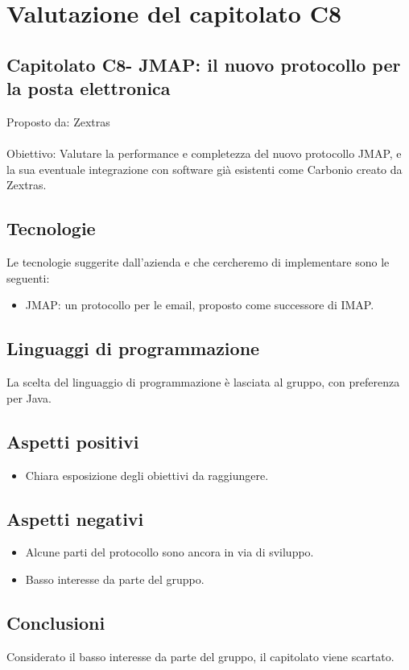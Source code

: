 \documentclass{article}
\begin{document}
\section{Valutazione del capitolato C8}
\subsection{Capitolato C8- JMAP: il nuovo protocollo per la posta elettronica}
Proposto da: Zextras\\ \\
Obiettivo: Valutare la performance e completezza del nuovo protocollo JMAP, e la sua eventuale integrazione con software già esistenti come Carbonio creato da Zextras.
\subsection{Tecnologie}
Le tecnologie suggerite dall’azienda e che cercheremo di implementare sono le seguenti:
\begin{itemize}
    \item JMAP: un protocollo per le email, proposto come successore di IMAP.
\end{itemize}
\subsection{Linguaggi di programmazione}
La scelta del linguaggio di programmazione è lasciata al gruppo, con preferenza per Java.
\subsection{Aspetti positivi}
\begin{itemize}
    \item Chiara esposizione degli obiettivi da raggiungere.
\end{itemize}
\subsection{Aspetti negativi}
\begin{itemize}
    \item Alcune parti del protocollo sono ancora in via di sviluppo.
    \item Basso interesse da parte del gruppo.
\end{itemize}
\subsection{Conclusioni}
Considerato il basso interesse da parte del gruppo, il capitolato viene scartato.
\end{document}
